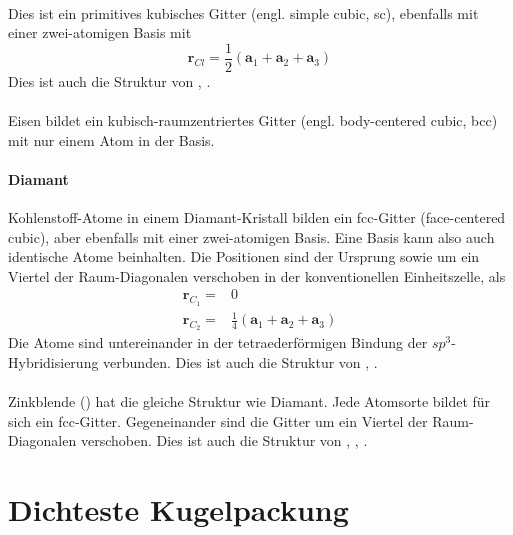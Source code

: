 \paragraph{}
Dies ist ein primitives kubisches Gitter (engl. simple cubic, sc), ebenfalls mit einer zwei-atomigen Basis mit 
\begin{equation}
 \mathbf{r}_{Cl} = \frac{1}{2} \left(\mathbf{a}_1 + \mathbf{a}_2 +  \mathbf{a}_3  \right)
\end{equation}
Dies ist auch die Struktur von , .

\paragraph{} Eisen bildet ein kubisch-raumzentriertes Gitter (engl. body-centered cubic, bcc) mit nur einem Atom in der Basis.

\paragraph{Diamant} Kohlenstoff-Atome in einem Diamant-Kristall bilden ein fcc-Gitter (face-centered cubic), aber ebenfalls mit einer zwei-atomigen Basis. Eine Basis kann also auch identische Atome beinhalten. Die Positionen sind der Ursprung sowie um ein Viertel der Raum-Diagonalen verschoben in der konventionellen Einheitszelle, als
\begin{align}
 \mathbf{r}_{C_1} = & 0 \\
 \mathbf{r}_{C_2} = & \frac{1}{4} \left(\mathbf{a}_1 + \mathbf{a}_2 +  \mathbf{a}_3  \right)
\end{align}
Die Atome sind untereinander in der tetraederförmigen Bindung der $sp^3$-Hybridisierung verbunden. Dies ist auch die Struktur von , .

\paragraph{} Zinkblende () hat die gleiche Struktur wie Diamant. Jede Atomsorte bildet für sich ein fcc-Gitter. Gegeneinander sind die Gitter um ein Viertel der Raum-Diagonalen verschoben. Dies ist auch die Struktur von , , .


\section{Dichteste Kugelpackung}

